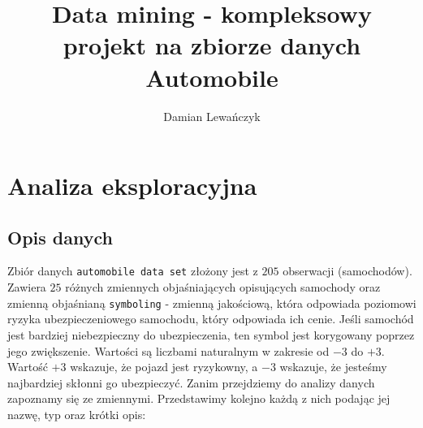 \documentclass[12pt, a4paper]{article}\usepackage[]{graphicx}\usepackage[]{xcolor}
\begin{document}



\title{Data mining - kompleksowy \\
projekt na zbiorze danych Automobile}
\author{Damian Lewańczyk}
\date{}
\maketitle
\tableofcontents

%

\section{Analiza eksploracyjna}  
\subsection{Opis danych}
%



Zbiór danych \texttt{automobile data set} złożony jest z $205$ obserwacji (samochodów). Zawiera $25$ różnych zmiennych objaśniających opisujących samochody oraz zmienną objaśnianą \texttt{symboling} - zmienną jakościową, która odpowiada poziomowi ryzyka ubezpieczeniowego samochodu, który odpowiada ich cenie. Jeśli samochód jest bardziej niebezpieczny do ubezpieczenia, ten symbol jest korygowany poprzez jego zwiększenie. Wartości są liczbami naturalnym w zakresie od $-3$ do $+3$. Wartość $+3$ wskazuje, że pojazd jest ryzykowny, a $-3$ wskazuje, że jesteśmy najbardziej skłonni go ubezpieczyć. Zanim przejdziemy do analizy danych zapoznamy się ze zmiennymi. Przedstawimy kolejno każdą z nich podając jej nazwę, typ oraz krótki opis:
\end{document}
